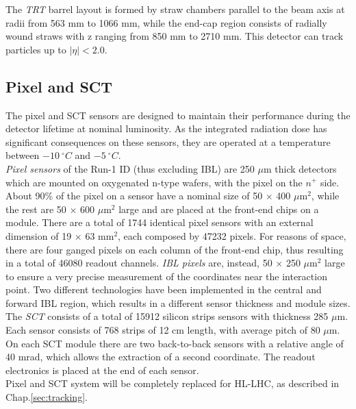 \documentclass[a4paper,twoside,12pt]{book}
\begin{document}
The \textit{TRT} barrel layout is formed by straw chambers parallel to the beam axis at radii from 563 mm to 1066 mm,
while the end-cap region consists of radially wound straws with z ranging from 850 mm to 
2710 mm. This detector can track particles up to $|\eta| < 2.0$.

\subsection*{Pixel and SCT}

The pixel and SCT sensors are designed to maintain their performance during the detector
lifetime at nominal luminosity\cite{Aad:2008zzm}. As the integrated radiation dose has significant consequences
on these sensors, they are operated at a temperature between $-10\ ^{\circ}C$ and $-5\ ^{\circ}C$.\\

\textit{Pixel sensors} of the Run-1 ID (thus excluding IBL) are 250 $\mu$m thick detectors which are mounted on oxygenated n-type wafers, with the pixel on the $n^+$ side. About 90\% of the pixel on a sensor have a nominal 
size of 50 $\times$ 400 $\mu$m$^2$, while the rest are 50 $\times$ 600 $\mu$m$^2$ large and are placed
at the front-end chips on a module. There are a total of 1744 identical pixel sensors with an external dimension of 19 $\times$ 63 mm$^2$, each composed by 47232 pixels. For reasons of space, there are four ganged pixels on each column of the front-end chip, thus resulting in a total of 46080 readout channels. \textit{IBL pixels} are, instead, 50 $\times$ 250 $\mu$m$^2$ large to 
ensure a very precise measurement of the coordinates near the interaction point\cite{IBL}. Two 
different technologies have been implemented in the central and forward IBL region, which
results in a different sensor thickness and module sizes.\\

The \textit{SCT} consists of a total of 15912 silicon strips sensors with thickness 285 $\mu$m. Each sensor consists of 768 strips of 12 cm length, with average pitch of 80 $\mu$m.
On each SCT module there are two back-to-back sensors with a relative angle of 40 mrad,
which allows the extraction of a second coordinate. The readout electronics is placed at the end of each sensor.\\

Pixel and SCT system will be completely replaced for HL-LHC, as described in Chap.\ref{sec:tracking}.
\end{document}
